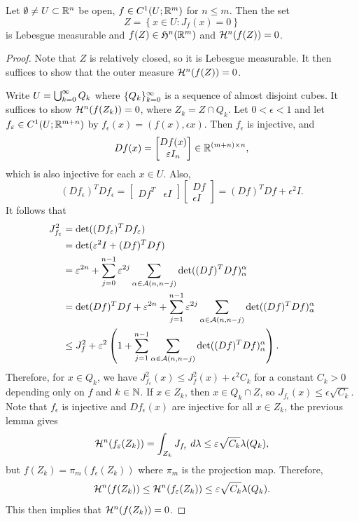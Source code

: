 \documentclass[a4paper]{article}
\begin{document}
\begin{thm}
Let $\emptyset \neq U \subset \mathbb{R}^n$ be open, $f \in C^1 (U; 
\mathbb{R}^m)$ for $n \leq m$. Then the set 
\[
Z = \left\{ x \in U: J_f(x) = 0 \right\}
\]
is Lebesgue measurable and $f(Z) \in \mathfrak{H}^n(\mathbb{R}^m)$ and 
$\mathcal{H}^n (f(Z)) = 0$.
\end{thm}

\begin{proof}
Note that $Z$ is relatively closed, so it is Lebesgue
measurable. It then suffices to show that the outer 
measure $\mathcal{H}^n (f(Z)) = 0$.

Write $U = \bigcup_{k=0}^\infty Q_k$ where $\{ Q_k \}_{k=0}^\infty$ is 
a sequence of almost disjoint cubes. It suffices to show 
$\mathcal{H}^n (f(Z_k)) = 0$, where $Z_k = Z \cap Q_k$.
Let $0 < \epsilon < 1$ and let $f_\varepsilon \in C^1 (U; 
\mathbb{R}^{m+n})$ by $f_\epsilon(x) = (f(x), \epsilon x)$.
Then $f_\epsilon$ is injective, and 
\[
Df(x) = \begin{bmatrix}
  Df(x) \\ 
  \varepsilon I_n
\end{bmatrix}
\in \mathbb{R}^{(m + n) \times n},
\]
which is also injective for each $x \in U$. Also, 
\[
(Df_\epsilon)^T Df_\epsilon = 
\begin{bmatrix}
  Df^T & \epsilon I
\end{bmatrix}
\begin{bmatrix}
  Df \\ 
  \epsilon I 
\end{bmatrix}
= (Df)^T Df + \epsilon^2 I.
\]
It follows that 
\[
\begin{aligned}
  J_{f_\varepsilon}^2 
  &= \det((Df_\varepsilon)^T Df_\varepsilon) \\
  &= \det(\varepsilon^2 I + (Df)^T Df) \\
  &= \varepsilon^{2n} + \sum_{j=0}^{n-1} \varepsilon^{2j} 
  \sum_{\alpha \in \mathcal{A}(n, n - j)} \det((Df)^T Df)_\alpha^\alpha \\ 
  &= \det (Df)^T Df + \varepsilon^{2n} 
  + \sum_{j=1}^{n-1} \varepsilon^{2j} \sum_{\alpha \in \mathcal{A}(n, n-j)}
  \det((Df)^T Df)_\alpha^\alpha \\
  &\leq J_f^2 + \varepsilon^2 \left( 1 + 
  \sum_{j=1}^{n-1} \sum_{\alpha \in \mathcal{A}(n, n-j)}
  \det((Df)^T Df)_\alpha^\alpha \right).
\end{aligned}
\]
Therefore, for $x \in Q_k$, we have $J_{f_\epsilon}^2 (x)
\leq J_f^2(x) + \epsilon^2 C_k$ for a constant 
$C_k > 0$ depending only on $f$ and $k \in \mathbb{N}$. 
If $x \in Z_k$, then $x \in Q_k \cap Z$, so 
$J_{f_\epsilon} (x) \leq \epsilon \sqrt{C_k}$. 
Note that $f_\epsilon$ is injective and 
$Df_\epsilon(x)$ are injective for all $x \in Z_k$, 
the previous lemma gives 
\[
\mathcal{H}^n (f_\varepsilon(Z_k))
= \int_{Z_k} J_{f_\varepsilon} \; d \lambda
\leq \varepsilon \sqrt{C_k} \lambda(Q_k),
\]
but $f(Z_k) = \pi_{m} (f_\epsilon (Z_k))$ where 
$\pi_m$ is the projection map. Therefore, 
\[
\mathcal{H}^n (f(Z_k)) \leq \mathcal{H}^n (f_\varepsilon (Z_k))
\leq \varepsilon \sqrt{C_k} \lambda (Q_k).
\]
This then implies that $\mathcal{H}^n(f(Z_k)) = 0$.
\end{proof}
\end{document}
